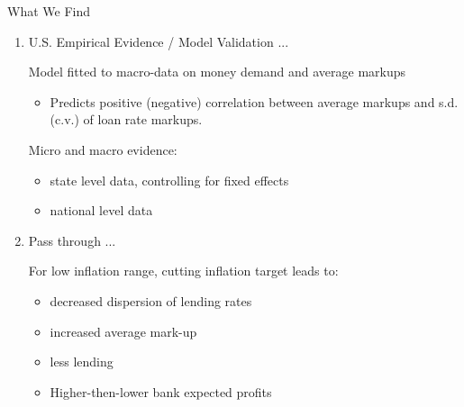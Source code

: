 \documentclass[10pt,english,slidetop,compress,
              blue,mathserif,color=option]{beamer}
\theoremstyle{plain}
\theoremstyle{definition}
\begin{document}
\begin{frame}[allowframebreaks]{What We Find}
  \begin{enumerate}
    \item \alert{U.S. Empirical Evidence / Model Validation} ...
    
      \bigskip
    
      Model fitted to macro-data on money demand and average markups
      \begin{itemize}
        \item Predicts positive (negative) correlation between average markups and s.d. (c.v.) of loan rate markups. 
        \medskip
        

        
        
      \end{itemize}

      \bigskip

      Micro and macro evidence:
      \begin{itemize}
        \item state level data, controlling for fixed effects
        \item national level data
      \end{itemize}

      \break
      \item \alert{Pass through} ...
        \medskip

        For low inflation range, cutting inflation target leads to:
        \begin{itemize}
          \item decreased dispersion of lending rates
          \item increased average mark-up
          \item less lending
          \item Higher-then-lower bank expected profits
        \end{itemize}


\end{enumerate}
\end{frame}
\end{document}
